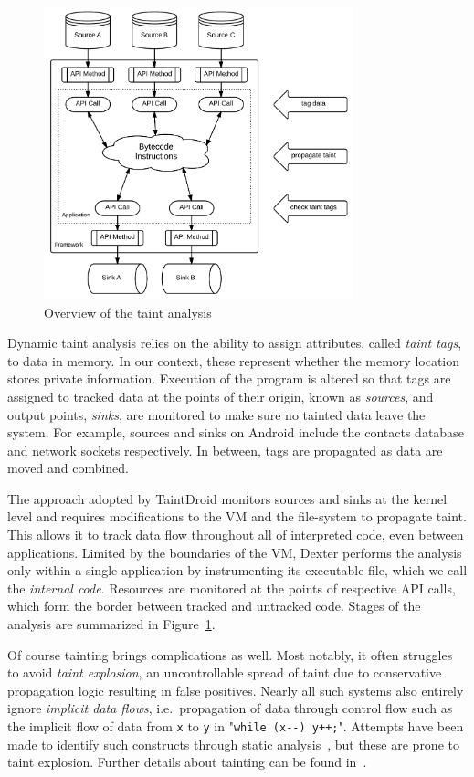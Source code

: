 \documentclass[12pt,twoside,notitlepage]{report}
\begin{document}
\begin{figure}
	\centerline{	
		\includegraphics[width=0.8\textwidth]{figs/fig_intro_tainting.png}
	}
	\caption{Overview of the taint analysis}
	\label{fig:Introduction_TaintingOverview}
\end{figure}

Dynamic taint analysis relies on the ability to assign attributes, called \emph{taint tags}, to data in memory. In our context, these represent whether the memory location stores private information. Execution of the program is altered so that tags are assigned to tracked data at the points of their origin, known as \emph{sources}, and output points, \emph{sinks}, are monitored to make sure no tainted data leave the system. For example, sources and sinks on Android include the contacts database and network sockets respectively. In between, tags are propagated as data are moved and combined. 

The approach adopted by TaintDroid monitors sources and sinks at the kernel level and requires modifications to the VM and the file-system to propagate taint. This allows it to track data flow throughout all of interpreted code, even between applications. Limited by the boundaries of the VM, Dexter performs the analysis only within a single application by instrumenting its executable file, which we call the \emph{internal code}. Resources are monitored at the points of respective API calls, which form the border between tracked and untracked code. Stages of the analysis are summarized in Figure~\ref{fig:Introduction_TaintingOverview}. 

Of course tainting brings complications as well. Most notably, it often struggles to avoid \emph{taint explosion}, an uncontrollable spread of taint due to conservative propagation logic resulting in false positives. Nearly all such systems also entirely ignore \emph{implicit data flows}, i.e.\ propagation of data through control flow such as the implicit flow of data from \texttt{x} to \texttt{y} in "\verb$while (x--) y++;$". Attempts have been made to identify such constructs through static analysis~\cite{Nair:2008:VMB:1346355.1346524}, but these are prone to taint explosion. Further details about tainting can be found in~\cite{Schwartz:2010:YEW:1849417.1849981, Ermolinskiy:EECS-2010-92}.
\end{document}
